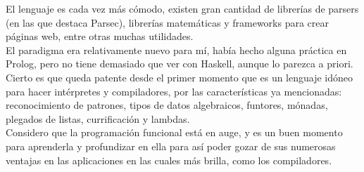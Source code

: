 El lenguaje es cada vez m\'as c\'omodo, existen gran cantidad de librer\'ias de parsers (en las que destaca Parsec), librer\'ias matem\'aticas y frameworks para crear p\'aginas web, entre otras muchas utilidades.\\

El paradigma era relativamente nuevo para m\'i, hab\'ia hecho alguna pr\'actica en Prolog, pero no tiene demasiado que ver con Haskell, aunque lo parezca a priori. Cierto es que queda patente desde el primer momento que es un lenguaje id\'oneo para hacer int\'erpretes y compiladores, por las caracter\'isticas ya mencionadas: reconocimiento de patrones, tipos de datos algebraicos, funtores, m\'onadas, plegados de listas, currificaci\'on y lambdas.\\

Considero que la programaci\'on funcional est\'a en auge, y es un buen momento para aprenderla y profundizar en ella para as\'i poder gozar de sus numerosas ventajas en las aplicaciones en las cuales m\'as brilla, como los compiladores.